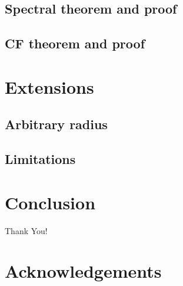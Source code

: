 \documentclass[twofold]{article}
\theoremstyle{plain}
\theoremstyle{definition}
\begin{document}
\subsection{Spectral theorem and proof}

\subsection{CF theorem and proof}


\section{Extensions}

\subsection{Arbitrary radius}

\subsection{Limitations}

\section{Conclusion}
Thank You!

\section{Acknowledgements}
\end{document}
